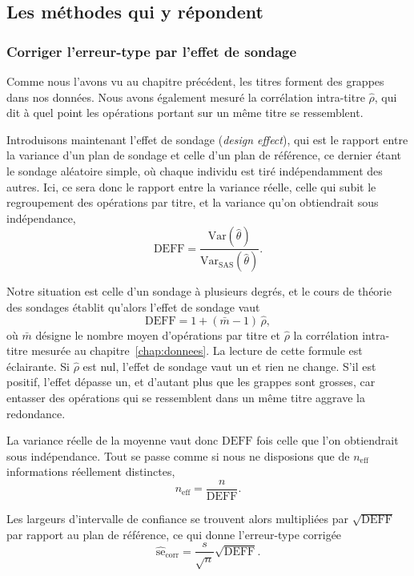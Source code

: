 \subsection{Les méthodes qui y répondent}

\subsubsection*{Corriger l'erreur-type par l'effet de sondage}

Comme nous l'avons vu au chapitre précédent, les titres forment des grappes
dans nos données. Nous avons également mesuré la corrélation intra-titre
$\hat\rho$, qui dit à quel point les opérations portant sur un même titre se
ressemblent.

Introduisons maintenant l'effet de sondage (\emph{design effect}), qui est le
rapport entre la variance d'un plan de sondage et celle d'un plan de
référence, ce dernier étant le sondage aléatoire simple, où chaque individu
est tiré indépendamment des autres. Ici, ce sera donc le rapport entre la
variance réelle, celle qui subit le regroupement des opérations par titre, et
la variance qu'on obtiendrait sous indépendance,
\[
  \mathrm{DEFF}
    = \frac{\mathrm{Var}(\hat\theta)}{\mathrm{Var}_{\mathrm{SAS}}(\hat\theta)} .
\]

Notre situation est celle d'un sondage à plusieurs degrés, et le cours de
théorie des sondages établit qu'alors l'effet de sondage vaut
\[
  \mathrm{DEFF} = 1 + (\bar m - 1)\,\hat\rho ,
\]
où $\bar m$ désigne le nombre moyen d'opérations par titre et $\hat\rho$ la
corrélation intra-titre mesurée au chapitre~\ref{chap:donnees}. La lecture de
cette formule est éclairante. Si $\hat\rho$ est nul, l'effet de sondage vaut
un et rien ne change. S'il est positif, l'effet dépasse un, et d'autant plus
que les grappes sont grosses, car entasser des opérations qui se ressemblent
dans un même titre aggrave la redondance.

La variance réelle de la moyenne vaut donc $\mathrm{DEFF}$ fois celle que l'on
obtiendrait sous indépendance. Tout se passe comme si nous ne disposions que
de $n_{\mathrm{eff}}$ informations réellement distinctes,
\[
  n_{\mathrm{eff}} = \frac{n}{\mathrm{DEFF}} .
\]

Les largeurs d'intervalle de confiance se trouvent alors multipliées par
$\sqrt{\mathrm{DEFF}}$ par rapport au plan de référence, ce qui donne
l'erreur-type corrigée
\[
  \widehat{\mathrm{se}}_{\mathrm{corr}}
        = \frac{s}{\sqrt{n}}\sqrt{\mathrm{DEFF}} .
\]

